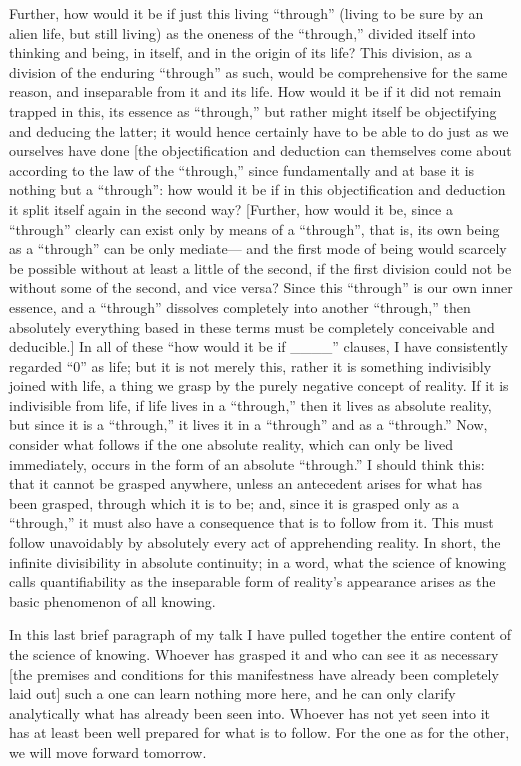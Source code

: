 Further, how would it be if just this living “through”
(living to be sure by an alien life, but still living)
as the oneness of the “through,”
divided itself into thinking and being,
in itself, and in the origin of its life?
This division, as a division of the enduring “through” as such,
would be comprehensive for the same reason,
and inseparable from it and its life.
How would it be if it did not remain trapped in this,
its essence as “through,” but rather might itself
be objectifying and deducing the latter;
it would hence certainly have to be able
to do just as we ourselves have done
[the objectification and deduction
can themselves come about according to the law of the “through,”
since fundamentally and at base it is nothing but a “through”:
how would it be if in this objectification and deduction
it split itself again in the second way?
[Further, how would it be,
since a “through” clearly can exist
only by means of a “through”,
that is, its own being as a “through” can be only mediate—
and the first mode of being
would scarcely be possible
without at least a little of the second,
if the first division could not be
without some of the second, and vice versa?
Since this “through” is our own inner essence,
and a “through” dissolves completely into another “through,”
then absolutely everything based in these terms
must be completely conceivable and deducible.]
In all of these “how would it be if ____” clauses,
I have consistently regarded “0” as life;
but it is not merely this,
rather it is something indivisibly joined with life,
a thing we grasp by the purely negative concept of reality.
If it is indivisible from life,
if life lives in a “through,”
then it lives as absolute reality,
but since it is a “through,”
it lives it in a “through”
and as a “through.”
Now, consider what follows
if the one absolute reality,
which can only be lived immediately,
occurs in the form of an absolute “through.”
I should think this:
that it cannot be grasped anywhere,
unless an antecedent arises
for what has been grasped,
through which it is to be;
and, since it is grasped only as a “through,”
it must also have a consequence
that is to follow from it.
This must follow unavoidably
by absolutely every act
of apprehending reality.
In short, the infinite divisibility in absolute continuity;
in a word, what the science of knowing calls quantifiability
as the inseparable form of reality’s appearance
arises as the basic phenomenon of all knowing.

In this last brief paragraph of my talk
I have pulled together the entire content
of the science of knowing.
Whoever has grasped it
and who can see it as necessary
[the premises and conditions for this
manifestness have already been completely laid out]
such a one can learn nothing more here,
and he can only clarify analytically
what has already been seen into.
Whoever has not yet seen into it has
at least been well prepared for what is to follow.
For the one as for the other,
we will move forward tomorrow.

